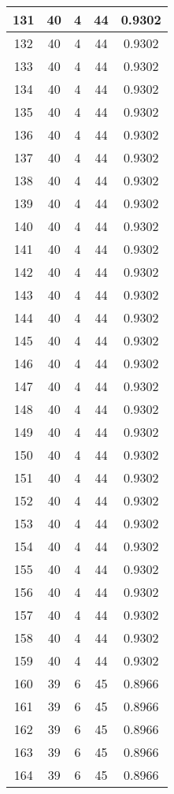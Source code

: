 \documentclass[letterpaper, 12pt]{article}
\begin{document}
\begin{longtable}{|c|c|c|c|c|}
\hline
131 & 40 & 4 & 44 & 0.9302 \\
\hline
132 & 40 & 4 & 44 & 0.9302 \\
\hline
133 & 40 & 4 & 44 & 0.9302 \\
\hline
134 & 40 & 4 & 44 & 0.9302 \\
\hline
135 & 40 & 4 & 44 & 0.9302 \\
\hline
136 & 40 & 4 & 44 & 0.9302 \\
\hline
137 & 40 & 4 & 44 & 0.9302 \\
\hline
138 & 40 & 4 & 44 & 0.9302 \\
\hline
139 & 40 & 4 & 44 & 0.9302 \\
\hline
140 & 40 & 4 & 44 & 0.9302 \\
\hline
141 & 40 & 4 & 44 & 0.9302 \\
\hline
142 & 40 & 4 & 44 & 0.9302 \\
\hline
143 & 40 & 4 & 44 & 0.9302 \\
\hline
144 & 40 & 4 & 44 & 0.9302 \\
\hline
145 & 40 & 4 & 44 & 0.9302 \\
\hline
146 & 40 & 4 & 44 & 0.9302 \\
\hline
147 & 40 & 4 & 44 & 0.9302 \\
\hline
148 & 40 & 4 & 44 & 0.9302 \\
\hline
149 & 40 & 4 & 44 & 0.9302 \\
\hline
150 & 40 & 4 & 44 & 0.9302 \\
\hline
151 & 40 & 4 & 44 & 0.9302 \\
\hline
152 & 40 & 4 & 44 & 0.9302 \\
\hline
153 & 40 & 4 & 44 & 0.9302 \\
\hline
154 & 40 & 4 & 44 & 0.9302 \\
\hline
155 & 40 & 4 & 44 & 0.9302 \\
\hline
156 & 40 & 4 & 44 & 0.9302 \\
\hline
157 & 40 & 4 & 44 & 0.9302 \\
\hline
158 & 40 & 4 & 44 & 0.9302 \\
\hline
159 & 40 & 4 & 44 & 0.9302 \\
\hline
160 & 39 & 6 & 45 & 0.8966 \\
\hline
161 & 39 & 6 & 45 & 0.8966 \\
\hline
162 & 39 & 6 & 45 & 0.8966 \\
\hline
163 & 39 & 6 & 45 & 0.8966 \\
\hline
164 & 39 & 6 & 45 & 0.8966 \\

\end{longtable}
\end{document}
